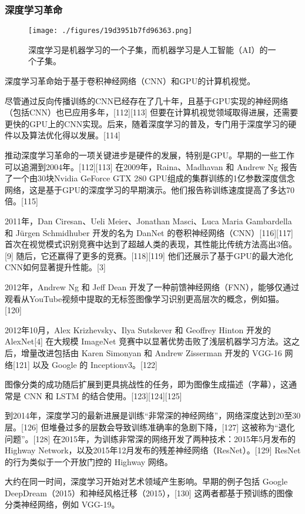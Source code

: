 \subsubsection{深度学习革命}
\begin{figure}[ht]
\centering
\texttt{[image: ./figures/19d3951b7fd96363.png]}
\caption{深度学习是机器学习的一个子集，而机器学习是人工智能（AI）的一个子集。} \label{fig_SDXX_2}
\end{figure}
深度学习革命始于基于卷积神经网络（CNN）和GPU的计算机视觉。

尽管通过反向传播训练的CNN已经存在了几十年，且基于GPU实现的神经网络（包括CNN）也已应用多年，[112][113] 但要在计算机视觉领域取得进展，还需要更快的GPU上的CNN实现。后来，随着深度学习的普及，专门用于深度学习的硬件以及算法优化得以发展。[114]

推动深度学习革命的一项关键进步是硬件的发展，特别是GPU。早期的一些工作可以追溯到2004年。[112][113] 在2009年，Raina、Madhavan 和 Andrew Ng 报告了一个由30块Nvidia GeForce GTX 280 GPU组成的集群训练的1亿参数深度信念网络，这是基于GPU的深度学习的早期演示。他们报告称训练速度提高了多达70倍。[115]

2011年，Dan Ciresan、Ueli Meier、Jonathan Masci、Luca Maria Gambardella 和 Jürgen Schmidhuber 开发的名为 DanNet 的卷积神经网络（CNN）[116][117] 首次在视觉模式识别竞赛中达到了超越人类的表现，其性能比传统方法高出3倍。[9] 随后，它还赢得了更多的竞赛。[118][119] 他们还展示了基于GPU的最大池化CNN如何显著提升性能。[3]

2012年，Andrew Ng 和 Jeff Dean 开发了一种前馈神经网络（FNN），能够仅通过观看从YouTube视频中提取的无标签图像学习识别更高层次的概念，例如猫。[120]

2012年10月，Alex Krizhevsky、Ilya Sutskever 和 Geoffrey Hinton 开发的 AlexNet[4] 在大规模 ImageNet 竞赛中以显著优势击败了浅层机器学习方法。这之后，增量改进包括由 Karen Simonyan 和 Andrew Zisserman 开发的 VGG-16 网络[121] 以及 Google 的 Inceptionv3。[122]

图像分类的成功随后扩展到更具挑战性的任务，即为图像生成描述（字幕），这通常是 CNN 和 LSTM 的结合使用。[123][124][125]

到2014年，深度学习的最新进展是训练“非常深的神经网络”，网络深度达到20至30层。[126] 但堆叠过多的层数会导致训练准确率的急剧下降，[127] 这被称为“退化问题”。[128] 在2015年，为训练非常深的网络开发了两种技术：2015年5月发布的 Highway Network，以及2015年12月发布的残差神经网络（ResNet）。[129] ResNet 的行为类似于一个开放门控的 Highway 网络。

大约在同一时间，深度学习开始对艺术领域产生影响。早期的例子包括 Google DeepDream（2015）和神经风格迁移（2015），[130] 这两者都基于预训练的图像分类神经网络，例如 VGG-19。

